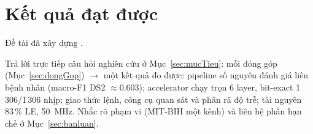 \section{Kết quả đạt được}\label{sec:ketqua}
Đề tài đã xây dựng \dinhvi.

\begin{goiy}
  Trả lời trực tiếp câu hỏi nghiên cứu ở Mục~\ref{sec:mucTieu}: mỗi đóng góp (Mục~\ref{sec:dongGop}) $\to$ một kết quả đo được:
  pipeline số nguyên đánh giá liên bệnh nhân (macro-F1 DS2 $\approx0.603$); accelerator chạy trọn 6 layer, bit-exact 1\,306/1\,306 nhịp;
  giao thức lệnh, công cụ quan sát và phân rã độ trễ; tài nguyên 83\,\% LE, 50~MHz.
  Nhắc rõ phạm vi (MIT-BIH một kênh) và liên hệ phần hạn chế ở Mục~\ref{sec:banluan}.
\end{goiy}
